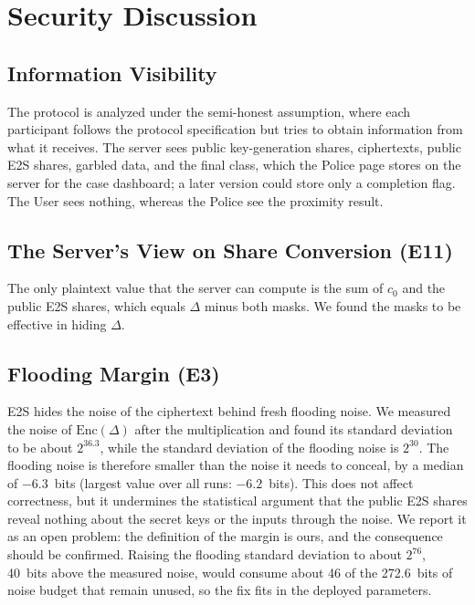 \documentclass[conference,letterpaper]{IEEEtran}
\begin{document}
\section{Security Discussion}\label{sec:security}
\subsection{Information Visibility}
The protocol is analyzed under the semi-honest assumption, where each participant follows the protocol specification but tries to obtain information from what it receives. The server sees public key-generation shares, ciphertexts, public E2S shares, garbled data, and the final class, which the Police page stores on the server for the case dashboard; a later version could store only a completion flag. The User sees nothing, whereas the Police see the proximity result.

\subsection{The Server's View on Share Conversion (E11)}
The only plaintext value that the server can compute is the sum of $c_0$ and the public E2S shares, which equals $\Delta$ minus both masks. We found the masks to be effective in hiding $\Delta$.

\subsection{Flooding Margin (E3)}\label{sec:flood}
E2S hides the noise of the ciphertext behind fresh flooding noise. We measured the noise of $\mathrm{Enc}(\Delta)$ after the multiplication and found its standard deviation to be about $2^{36.3}$, while the standard deviation of the flooding noise is $2^{30}$. The flooding noise is therefore smaller than the noise it needs to conceal, by a median of $-6.3$~bits (largest value over all runs: $-6.2$~bits). This does not affect correctness, but it undermines the statistical argument that the public E2S shares reveal nothing about the secret keys or the inputs through the noise. We report it as an open problem: the definition of the margin is ours, and the consequence should be confirmed. Raising the flooding standard deviation to about $2^{76}$, 40~bits above the measured noise, would consume about 46 of the 272.6~bits of noise budget that remain unused, so the fix fits in the deployed parameters.
\end{document}
